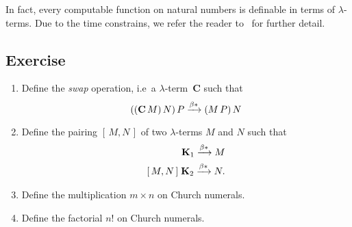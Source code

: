 In fact, every computable function on natural numbers is definable in terms of
$\lambda$-terms. Due to the time constrains, we refer the reader
to~\cite[Chapter 3]{Barendregt1984} for further detail.
\subsection*{Exercise}
\begin{enumerate}
  \item Define the \emph{swap} operation, i.e\ a $\lambda$-term~$\mathbf{C}$
    such that
    \[
      ((\mathbf{C}\,M)\,N)\,P
      \xrightarrow{\beta*} (M\,P)\,N
    \]
  \item Define the pairing $[\,M, N\,]$ of two $\lambda$-terms $M$ and $N$
    such that
    \begin{align*}
      [\,M, N\,]\;\mathbf{K}_1 \reduce M \\
      [\,M, N\,]\;\mathbf{K}_2 \reduce N.
    \end{align*}
  \item Define the multiplication $m \times n$ on Church numerals.
  \item Define the factorial $n!$ on Church numerals.
\end{enumerate}

 

